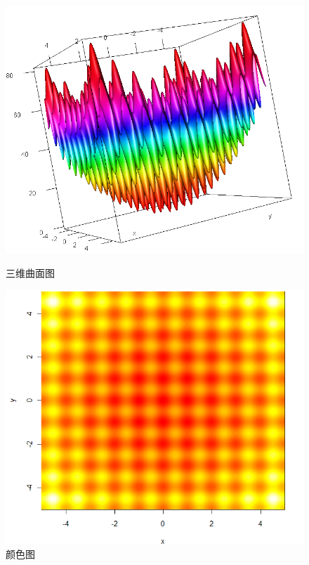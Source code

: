 \begin{figure}
\begin{minipage}[t]{0.50\linewidth}
\centering
\includegraphics[width=\textwidth]{./pic/dim3.png}
\caption{三维曲面图 \label{fig:sanwei}}
\end{minipage}
\hfill
\begin{minipage}[t]{0.50\linewidth}
\centering
\includegraphics[width=\textwidth]{./pic/a.png}
\caption{颜色图\label{fig:color}}
\end{minipage}
\end{figure}

